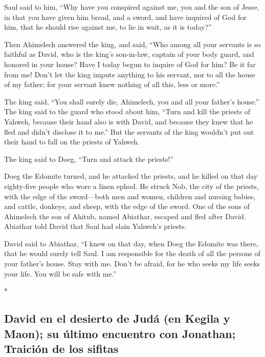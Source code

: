 \begin{paracol}{2}
\begin{otherlanguage}{english}
 Saul said to him, ``Why have you conspired against me,
you and the son of Jesse, in that you have given him bread, and a sword,
and have inquired of God for him, that he should rise against me, to lie
in wait, as it is today?''

 Then Ahimelech answered the king, and said, ``Who among
all your servants is so faithful as David, who is the king's son-in-law,
captain of your body guard, and honored in your house? 
Have I today begun to inquire of God for him? Be it far from me! Don't
let the king impute anything to his servant, nor to all the house of my
father; for your servant knew nothing of all this, less or more.''

 The king said, ``You shall surely die, Ahimelech, you
and all your father's house.''  The king said to the
guard who stood about him, ``Turn and kill the priests of Yahweh,
because their hand also is with David, and because they knew that he
fled and didn't disclose it to me.'' But the servants of the king
wouldn't put out their hand to fall on the priests of Yahweh.

 The king said to Doeg, ``Turn and attack the priests!''

Doeg the Edomite turned, and he attacked the priests, and he killed on
that day eighty-five people who wore a linen ephod.  He
struck Nob, the city of the priests, with the edge of the sword---both
men and women, children and nursing babies, and cattle, donkeys, and
sheep, with the edge of the sword.  One of the sons of
Ahimelech the son of Ahitub, named Abiathar, escaped and fled after
David.  Abiathar told David that Saul had slain Yahweh's
priests.

 David said to Abiathar, ``I knew on that day, when Doeg
the Edomite was there, that he would surely tell Saul. I am responsible
for the death of all the persons of your father's house. 
Stay with me. Don't be afraid, for he who seeks my life seeks your life.
You will be safe with me.''

\end{otherlanguage}

\switchcolumn[0]*

\hypertarget{david-en-el-desierto-de-juduxe1-en-kegila-y-maon-su-uxfaltimo-encuentro-con-jonathan-traiciuxf3n-de-los-sifitas}{%
\subsection{David en el desierto de Judá (en Kegila y Maon); su último
encuentro con Jonathan; Traición de los
sifitas}\label{david-en-el-desierto-de-juduxe1-en-kegila-y-maon-su-uxfaltimo-encuentro-con-jonathan-traiciuxf3n-de-los-sifitas}}


\end{paracol}
